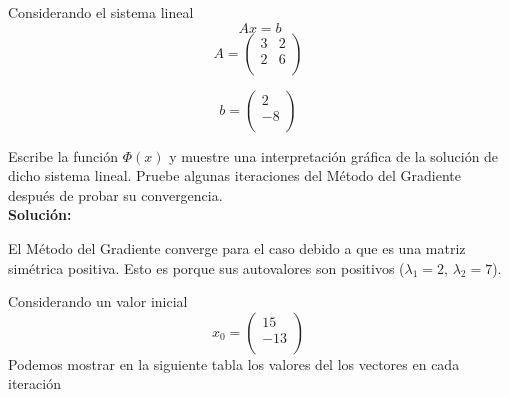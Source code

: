 
Considerando el sistema lineal
$$ Ax=b$$
$$ A=\begin{pmatrix}
     3 &  2 \\
     2 &  6 \\
    \end{pmatrix}\ $$
    
$$ b=\begin{pmatrix}
     2 \\
     -8 \\
    \end{pmatrix}\ $$
    
Escribe la función $ \Phi(x) $ y muestre una interpretación gráfica de la solución de dicho sistema lineal. Pruebe algunas iteraciones del Método del Gradiente después de probar su convergencia.\\

\textbf{Solución:}

El Método del Gradiente converge para el caso debido a que es una matriz simétrica positiva. Esto es porque sus autovalores son positivos ($ \lambda _1 = 2$, $\lambda _2 = 7$).

Considerando un valor inicial 
$$x_0 = \begin{pmatrix}
     15 \\
     -13 \\
    \end{pmatrix}\ $$
Podemos mostrar en la siguiente tabla los valores del los vectores en cada iteración


